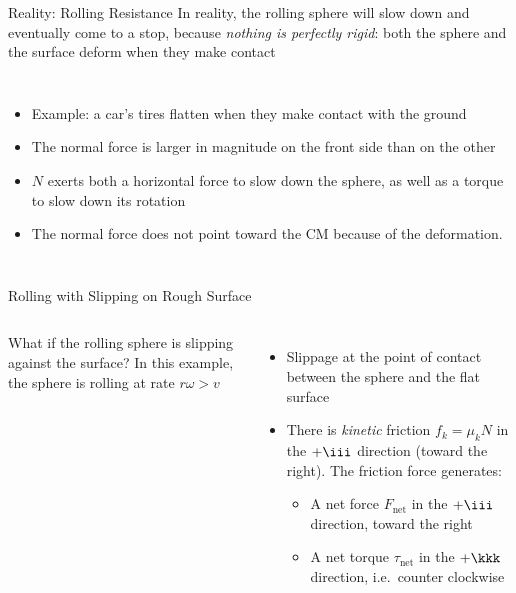 \documentclass[12pt,compress,aspectratio=169]{beamer}
\begin{document}
\begin{frame}{Reality: Rolling Resistance}
  In reality, the rolling sphere will slow down and eventually come to a stop,
  because \emph{nothing is perfectly rigid}: both the sphere and the surface
  deform when they make contact
  \begin{columns}
    \begin{itemize}
    \item Example: a car's tires flatten when they make contact with the ground
    \item The normal force is larger in magnitude on the front side than on the
      other
    \item $N$ exerts both a horizontal force to slow down the sphere, as well
      as a torque to slow down its rotation
    \item The normal force does not point toward the CM because of the
      deformation.
    \end{itemize}

    \vspace{.3in}
  \end{columns}
\end{frame}




\begin{frame}{Rolling with Slipping on Rough Surface}
  \begin{columns}
    

    What if the rolling sphere is slipping against the surface? In this
    example, the sphere is rolling at rate $r\omega>v$
    \begin{itemize}
    \item Slippage at the point of contact between the sphere and the flat
      surface
    \item There is \emph{kinetic} friction $f_k=\mu_kN$ in the $+\iii$
      direction (toward the right). The friction force generates:
      \begin{itemize}
      \item A net force $F_\text{net}$ in the $+\iii$ direction, toward the
        right
      \item A net torque $\tau_\text{net}$ in the $+\kkk$ direction, i.e.\
        counter clockwise
      \end{itemize}
    \end{itemize}
  \end{columns}
\end{frame}
\end{document}
